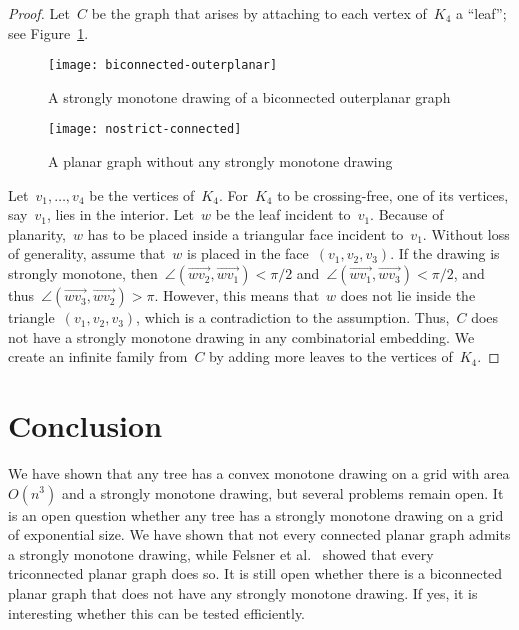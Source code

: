\documentclass[a4paper,11pt]{article}
\theoremstyle{plain}
\begin{document}
\begin{proof}
  Let~$C$ be the graph that arises by attaching to each vertex
  of~$K_4$ a ``leaf''; see Figure~\ref{fig:nostrict-connected}.
    \begin{figure}[tb]
    \begin{minipage}[t]{.5\columnwidth}
      \centering
      \texttt{[image: biconnected-outerplanar]}
      \caption{A strongly monotone drawing of a biconnected outerplanar graph}
      \label{fig:biconnected-outerplanar}
    \end{minipage}
    \hfill
    \begin{minipage}[t]{.43\columnwidth}
      \centering
      \texttt{[image: nostrict-connected]}
      \caption{A planar graph without any strongly monotone drawing}
      \label{fig:nostrict-connected}
    \end{minipage}
  \end{figure}
  Let~$v_1,\dots,v_4$ be the vertices of~$K_4$. For~$K_4$ to be
  crossing-free, one of its vertices, say~$v_1$, lies in the interior.
  Let~$w$ be the leaf incident to~$v_1$. 
  Because of planarity,~$w$ has to be placed inside
  a triangular face incident to~$v_1$. Without loss of generality, assume
  that~$w$ is placed in the face~$(v_1,v_2,v_3)$. If the drawing is
  strongly monotone, 
  then~$\angle(\overrightarrow{wv_2},\overrightarrow{wv_1})<\pi/2$
  and~$\angle(\overrightarrow{wv_1},\overrightarrow{wv_3})<\pi/2$,
  and thus~$\angle(\overrightarrow{wv_3},\overrightarrow{wv_2})>\pi$.
  However, this means that~$w$ does not lie inside the triangle~$(v_1,v_2,v_3)$,
  which is a contradiction to the assumption. Thus,~$C$ does not have
  a strongly monotone drawing in any combinatorial embedding.
  We create an infinite family from~$C$ by adding more leaves to the
  vertices of~$K_4$. 
\end{proof}


\section{Conclusion}
\label{sec:open}

We have shown that any tree has a convex monotone drawing on a grid with area
$O(n^3)$ and a strongly monotone drawing, but several problems remain open.
It is an open question whether any tree has a strongly monotone drawing on a grid 
of exponential size. We have shown that not every connected planar graph admits a strongly
monotone drawing, while Felsner et al.~\cite{fikkms-smdpg-socg16} showed that every
triconnected planar graph does so.
It is still open whether there is a biconnected planar 
graph that does not have any strongly monotone drawing. If yes, it is
interesting whether this can be tested efficiently. 



\end{document}
